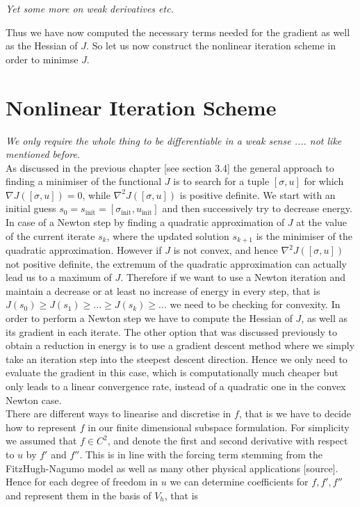 \documentclass[../draft_1.tex]{subfiles}
\begin{document}
\textit{Yet some more on weak derivatives etc.}

Thus we have now computed the necessary terms needed for the gradient as well as the Hessian of $J$. So let us now construct the nonlinear iteration scheme in order to minimse $J$. 


\section{Nonlinear Iteration Scheme}
\textit{We only require the whole thing to be differentiable in a weak sense .... not like mentioned before.} 
\smallskip
\\
As discussed in the previous chapter [see section 3.4] the general approach to finding a minimiser of the functional $J$ is to search for a tuple $[\sigma, u]$ for which $\nabla  J ([\sigma, u])= 0$, while $\nabla^2 J ([\sigma, u]) $ is positive definite. We start with an initial guess $s_0 = s_{\text{init}} = [\sigma_{\text{init}}, u_{\text{init}}]$ and then successively try to decrease energy. In case of a Newton step by finding a quadratic approximation of $J$ at the value of the current iterate $s_k$, where the updated solution $s_{k+1}$ is the minimiser of the quadratic approximation. However if $J$ is not convex, and hence $\nabla^2 J ([\sigma, u]) $ not positive definite, the extremum of the quadratic approximation can actually lead us to a maximum of $J$. Therefore if we want to use a Newton iteration and maintain a decrease or at least no increase of energy in every step, that is $J(s_0) \geq J(s_1) \geq ... \geq J(s_k) \geq ... $ we need to be checking for convexity. In order to perform a Newton step we have to compute the Hessian of $J$, as well as its gradient in each iterate. The other option that was discussed previously to obtain a reduction in energy is to use a gradient descent method where we simply take an iteration step into the steepest descent direction. Hence we only need to evaluate the gradient in this case, which is computationally much cheaper but only leads to a linear convergence rate, instead of a quadratic one in the convex Newton case. 
\smallskip
\\
There are different ways to linearise and discretise in $f$, that is we have to decide how to represent $f$ in our finite dimensional subspace formulation. For simplicity we assumed that $f \in C^2$, and denote the first and second derivative with respect to $u$ by $f'$ and $f''$. This is in line with the forcing term stemming from the FitzHugh-Nagumo model as well as many other physical applications [source]. Hence for each degree of freedom in $u$ we can determine coefficients for $f, f', f''$ and represent them in the basis of $V_h$, that is 
\end{document}
